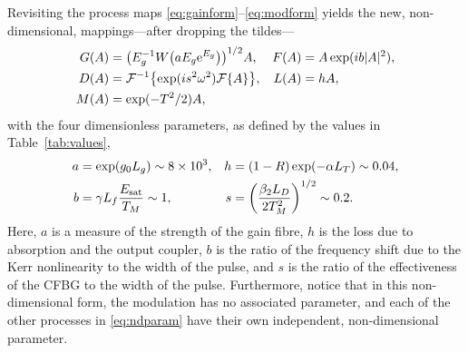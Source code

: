 \documentclass[9pt,twocolumn,twoside]{osajnl}
\let\originalleft\left
\let\originalright\right
\renewcommand{\left}{\mathopen{}\mathclose\bgroup\originalleft}
\renewcommand{\right}{\aftergroup\egroup\originalright}
\newcommand{\Es}{E_{\textrm{sat}}} %
\newcommand{\FT}[1]{\mathcal{F}\left\{ #1 \right\}} %
\newcommand{\FTi}[1]{\mathcal{F}^{-1}\left\{ #1 \right\}} %
\begin{document}
Revisiting the process maps \eqref{eq:gainform}--\eqref{eq:modform} yields the new, non-dimensional, mappings---after dropping the tildes---
\begin{align}
	G(A) &= \left(E_g^{-1} W \left( a E_g \textrm{e}^{E_g}\right) \right)^{1/2} A, & F(A) &= A \exp( i b |A|^2), \nonumber \\
	D(A) &= \FTi{\exp( i s^2 \omega^2 ) \FT{A}}, & L(A) &= h A, \label{eq:effects} \\
	M(A) &= \exp( -T^2 / 2 ) A, \nonumber
\end{align}
with the four dimensionless parameters, as defined by the values in Table~\ref{tab:values},
\begin{equation}
	\begin{aligned}
		a &= \exp( g_0 L_g ) \sim 8 \times 10^3, & 
		h &= (1 - R) \exp( - \alpha L_T) \sim 0.04, \\
		b &= \gamma L_f \frac{\Es}{T_M} \sim 1, & s &= \left( \frac{\beta_2 L_D}{2 T_M^2} \right)^{1/2} \sim 0.2.
		\label{eq:ndparam}
	\end{aligned}
\end{equation}
Here, $a$ is a measure of the strength of the gain fibre, $h$ is the loss due to absorption and the output coupler, $b$ is the ratio of the frequency shift due to the Kerr nonlinearity to the width of the pulse, and $s$ is the ratio of the effectiveness of the CFBG to the width of the pulse. Furthermore, notice that in this non-dimensional form, the modulation has no associated parameter, and each of the other processes in \eqref{eq:ndparam} have their own independent, non-dimensional parameter.
\end{document}
